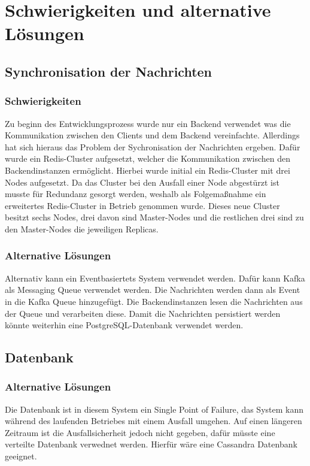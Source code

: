 \chapter{Schwierigkeiten und alternative Lösungen}

\section{Synchronisation der Nachrichten}
\subsection{Schwierigkeiten}
Zu beginn des Entwicklungsprozess wurde nur ein Backend verwendet was die Kommunikation zwischen den Clients und dem Backend vereinfachte.
Allerdings hat sich hieraus das Problem der Sychronisation der Nachrichten ergeben.
Dafür wurde ein Redis-Cluster aufgesetzt, welcher die Kommunikation zwischen den Backendinstanzen ermöglicht.
Hierbei wurde initial ein Redis-Cluster mit drei Nodes aufgesetzt.
Da das Cluster bei den Ausfall einer Node abgestürzt ist musste für Redundanz gesorgt werden, weshalb als Folgemaßnahme ein erweitertes Redis-Cluster in Betrieb genommen wurde.
Dieses neue Cluster besitzt sechs Nodes, drei davon sind Master-Nodes und die restlichen drei sind zu den Master-Nodes die jeweiligen Replicas.

\subsection{Alternative Lösungen}
Alternativ kann ein Eventbasiertets System verwendet werden.
Dafür kann Kafka als Messaging Queue verwendet werden.
Die Nachrichten werden dann als Event in die Kafka Queue hinzugefügt.
Die Backendinstanzen lesen die Nachrichten aus der Queue und verarbeiten diese.
Damit die Nachrichten persistiert werden könnte weiterhin eine PostgreSQL-Datenbank verwendet werden.


\section{Datenbank}

\subsection{Alternative Lösungen}
Die Datenbank ist in diesem System ein Single Point of Failure, das System kann während des laufenden Betriebes mit einem Ausfall umgehen.
Auf einen längeren Zeitraum ist die Ausfallsicherheit jedoch nicht gegeben, dafür müsste eine verteilte Datenbank verwednet werden. 
Hierfür wäre eine Cassandra Datenbank geeignet.
